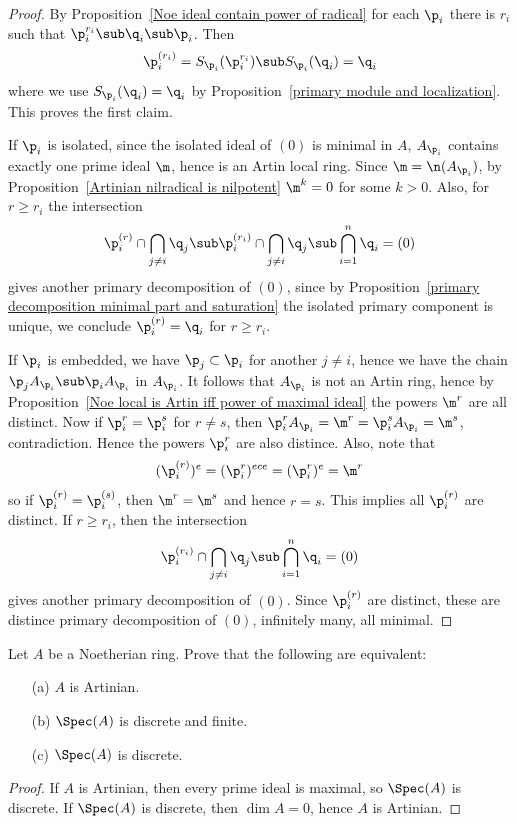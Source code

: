 \begin{proof}
By Proposition~\ref{Noe ideal contain power of radical} for each $\p_i$ there is $r_i$ such that $\p_i^{r_i}\sub\q_i\sub\p_i$. Then
\[\p_i^{(r_i)}=S_{\p_i}(\p_i^{r_i})\sub S_{\p_i}(\q_i)=\q_i\]
where we use $S_{\p_i}(\q_i)=\q_i$ by Proposition~\ref{primary module and localization}. This proves the first claim.\par
If $\p_i$ is isolated, since the isolated ideal of $(0)$ is minimal in $A$, $A_{\p_i}$ contains exactly one prime ideal $\m$, hence is an Artin local ring. Since $\m=\n(A_{\p_i})$, by Proposition~\ref{Artinian nilradical is nilpotent} $\m^k=0$ for some $k>0$. Also, for $r\geq r_i$ the intersection
\[\p_i^{(r)}\cap\bigcap_{j\neq i}\q_j\sub\p_i^{(r_i)}\cap\bigcap_{j\neq i}\q_j\sub\bigcap_{i=1}^{n}\q_i=(0)\] 
gives another primary decomposition of $(0)$, since by Proposition~\ref{primary decomposition minimal part and saturation} the isolated primary component is unique, we conclude $\p_i^{(r)}=\q_i$ for $r\geq r_i$.\par
If $\p_i$ is embedded, we have $\p_j\subset\p_i$ for another $j\neq i$, hence we have the chain $\p_jA_{\p_i}\sub \p_iA_{\p_i}$ in $A_{\p_i}$. It follows that $A_{\p_i}$ is not an Artin ring, hence by Proposition~\ref{Noe local is Artin iff power of maximal ideal} the powers $\m^r$ are all distinct. Now if $\p_i^r=\p_i^s$ for $r\neq s$, then $\p_i^rA_{\p_i}=\m^r=\p_i^sA_{\p_i}=\m^s$, contradiction. Hence the powers $\p_i^r$ are also distince. Also, note that
\[(\p_i^{(r)})^e=(\p_i^r)^{ece}=(\p_i^r)^e=\m^r\]
so if $\p_i^{(r)}=\p_i^{(s)}$, then $\m^r=\m^s$ and hence $r=s$. This implies all $\p_i^{(r)}$ are distinct. If $r\geq r_i$, then the intersection
\[\p_i^{(r_i)}\cap\bigcap_{j\neq i}\q_j\sub\bigcap_{i=1}^{n}\q_i=(0)\] 
gives another primary decomposition of $(0)$. Since $\p_i^{(r)}$ are distinct, these are distince primary decomposition of $(0)$, infinitely many, all minimal.
\end{proof}
\begin{exercise}\label{spec discrete iff Art}
Let $A$ be a Noetherian ring. Prove that the following are equivalent:
\begin{itemize}
\item[(a)] $A$ is Artinian.
\item[(b)] $\Spec(A)$ is discrete and finite.
\item[(c)] $\Spec(A)$ is discrete.
\end{itemize}
\end{exercise}
\begin{proof}
If $A$ is Artinian, then every prime ideal is maximal, so $\Spec(A)$ is discrete. If $\Spec(A)$ is discrete, then $\dim A=0$, hence $A$ is Artinian.
\end{proof}
